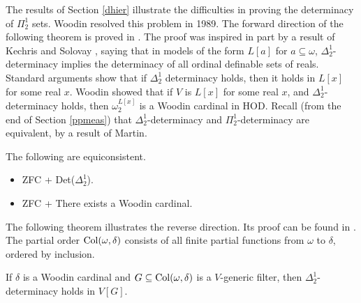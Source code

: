 \documentclass{book}%
\newcommand{\game}{\rotate[u]{\rotate[f]{$\Game$}}}
\newcommand{\less}{\mathord{<}}
\newcommand{\thing}{\mathord{-}}
\begin{document}
The results of Section \ref{dhier} illustrate the difficulties in proving
the determinacy of $\Pi^{1}_{2}$ sets. Woodin resolved this problem in 1989.
The forward direction of the following theorem is proved in \cite{KoellnerWoodin:handbook}. The proof was inspired in part by a result of Kechris and Solovay , saying that
in models of the form $L[a]$ for $a \subseteq \omega$, $\Delta^{1}_{2}$-determinacy implies the determinacy of all ordinal definable sets of
reals. Standard arguments show that if $\Delta^{1}_{2}$ determinacy holds,
then it holds in $L[x]$ for some real $x$. Woodin showed that if $V$
is $L[x]$ for some real $x$, and $\Delta^{1}_{2}$-determinacy holds,
then $\omega_{2}^{L[x]}$ is a Woodin cardinal in HOD. Recall (from the end of Section \ref{ppmeas}) that $\Delta^{1}_{2}$-determinacy and $\Pi^{1}_{2}$-determinacy are equivalent, by a result of Martin.

\begin{theorem} The
following are equiconsistent.
\begin{itemize}
\item {\rm ZFC} + {\rm Det}($\Delta^{1}_{2}$).
\item {\rm ZFC} + There exists a Woodin cardinal.
\end{itemize}
\end{theorem}

The following theorem illustrates the reverse direction. Its proof can be found in \cite[p.~1926]{Neeman:handbook}.
The partial order ${\rm Col}(\omega, \delta)$ consists of all finite partial functions from $\omega$ to $\delta$, ordered
by inclusion.

\begin{theorem} If\/ $\delta$ is a Woodin cardinal and $G
\subseteq {\rm Col}(\omega, \delta)$ is a $V$-generic filter, then
$\Delta^{1}_{2}$-determinacy holds in $V[G]$.
\end{theorem}










\end{document}
